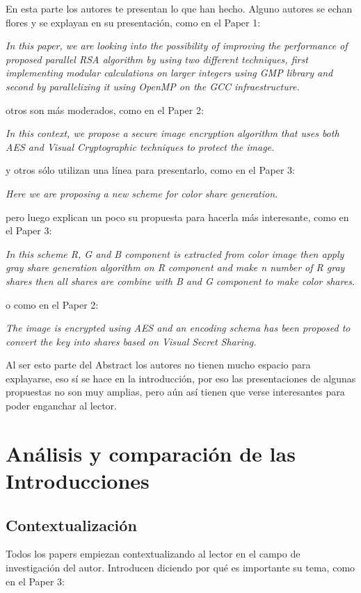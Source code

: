 \documentclass[a4paper,12pt]{article}
\begin{document}
En esta parte los autores te presentan lo que han hecho. Alguno autores se echan flores y se explayan en su presentación, como
en el Paper 1: \par
\textit{In this paper, we are looking into the possibility of improving
the performance of proposed parallel RSA algorithm by using two different techniques,
first implementing modular calculations on larger integers using GMP library and
second by parallelizing it using OpenMP on the GCC infraestructure.} \par
otros son más moderados, como en el Paper 2: \par
\textit{In this context, we propose a secure image
encryption algorithm that uses both AES and Visual
Cryptographic techniques to protect the image.} \par
y otros sólo utilizan una línea para presentarlo, como en el Paper 3: \par
\textit{Here we are proposing a new scheme for
color share generation.} \par
pero luego explican un poco su propuesta para hacerla más interesante, como en el Paper 3: \par
\textit{In this scheme R, G and B component is
extracted from color image then apply gray share generation
algorithm on R component and make n number of R gray shares
then all shares are combine with B and G component to make
color shares.} \par
o como en el Paper 2: \par
\textit{The image
is encrypted using AES and an encoding schema has been
proposed to convert the key into shares based on Visual
Secret Sharing.} \par
Al ser esto parte del Abstract los autores no tienen mucho espacio para explayarse, eso sí se hace en la introducción, por eso
las presentaciones de algunas propuestas no son muy amplias, pero aún así tienen que verse interesantes para poder enganchar
al lector.

\section{Análisis y comparación de las Introducciones}


\subsection{Contextualización}

Todos los papers empiezan contextualizando al lector en el campo de investigación del autor. Introducen diciendo por qué es
importante su tema, como en el Paper 3: \par
\end{document}
